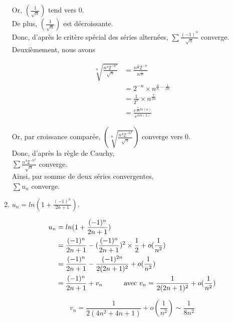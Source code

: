 \begin{enumerate}
{        Or, $\displaystyle (\frac{1}{\sqrt{n}})$ tend vers 0. \\
        De plus, $\displaystyle (\frac{1}{\sqrt{n}})$ est décroissante. \\
        Donc, d'après le critère spécial des séries alternées, $\displaystyle \sum \frac{(-1)^n}{\sqrt{n}}$ converge. \\

        Deuxièmement, nous avons

        \begin{align*}
            \sqrt[n]{\frac{n^4 2^{-n^2}}{\sqrt{n}}} &= \frac{n^{\frac{4}{n}} 2^{-n}}{n^{\frac{1}{2n}}} \\
            &= 2^{-n} \times n^{\frac{4}{n} - \frac{1}{2n}} \\
            &= \frac{1}{2^n} \times n^{\frac{7}{2n}} \\
            &= \frac{e^{\frac{7}{2n}ln(n)}}{e^{nln(2)}}
        \end{align*}

        Or, par croissance comparée, $\displaystyle (\sqrt[n]{\frac{n^4 2^{-n^2}}{\sqrt{n}}})$ converge vers 0. \\
        Donc, d'après la règle de Cauchy, \\
        $\displaystyle \sum \frac{n^4 2^{-n^2}}{\sqrt{n}}$ converge. \\

        Ainsi, par somme de deux séries convergentes, \\
        $\sum u_n$ converge.
    }

    \clearpage
    
    \item $\displaystyle u_n = ln(1 + \frac{(-1)^n}{2n + 1})$.

    \exobox
    {
        \begin{align*}
            u_n &= ln(1 + \frac{(-1)^n}{2n + 1}) \\
            &= \frac{(-1)^n}{2n + 1} - (\frac{(-1)^n}{2n + 1})^2 \times \frac{1}{2} + o(\frac{1}{n^2}) \\
            &= \frac{(-1)^n}{2n + 1} - \frac{(-1)^{2n}}{2(2n + 1)^2} + o(\frac{1}{n^2}) \\
            &= \frac{(-1)^n}{2n + 1} + v_n \hspace{30px} \text{avec } v_n = \frac{1}{2(2n + 1)^2} + o(\frac{1}{n^2})
        \end{align*}

        $$
            v_n = \frac{1}{2(4n^2 + 4n + 1)} + o(\frac{1}{n^2}) \sim \frac{1}{8n^2}
        $$

}
\end{enumerate}
